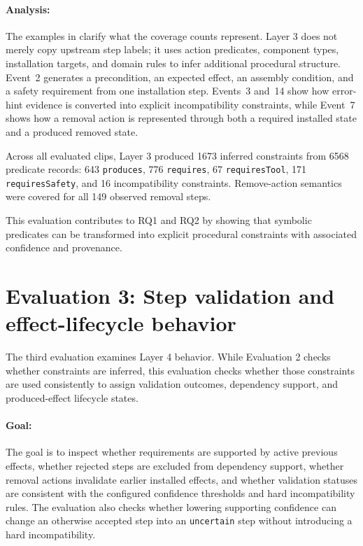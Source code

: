 \paragraph{Analysis:}
The examples in  clarify what the
coverage counts represent. Layer 3 does not merely copy upstream step labels; it uses action predicates, component types, installation targets, and domain rules to infer additional procedural structure. Event~2 generates a precondition, an expected effect, an assembly condition, and a safety requirement from one installation step. Events~3 and~14 show how error-hint evidence is converted into
explicit incompatibility constraints, while Event~7 shows how a removal action is represented through both a required installed state and a produced removed state.

Across all evaluated clips, Layer 3 produced 1673 inferred constraints from 6568 predicate records: 643 \texttt{produces}, 776 \texttt{requires}, 67 \texttt{requiresTool}, 171 \texttt{requiresSafety}, and 16 incompatibility constraints. Remove-action semantics were covered for all 149 observed removal steps.

This evaluation contributes to RQ1 and RQ2 by showing that symbolic predicates can be transformed into explicit procedural constraints with associated confidence and provenance.


\section{Evaluation 3: Step validation and effect-lifecycle behavior}
\label{sec:evaluation-validation-behavior}

The third evaluation examines Layer 4 behavior. While Evaluation 2 checks whether constraints are inferred, this evaluation checks whether those constraints are used consistently to assign validation outcomes, dependency support, and produced-effect lifecycle states.

\paragraph{Goal:}
The goal is to inspect whether requirements are supported by active previous effects, whether rejected steps are excluded from dependency support, whether removal actions invalidate earlier installed effects, and whether validation statuses are consistent with the configured confidence thresholds and hard incompatibility rules. The evaluation also checks whether lowering supporting confidence can change an otherwise accepted step into an \texttt{uncertain} step without introducing a hard incompatibility.


